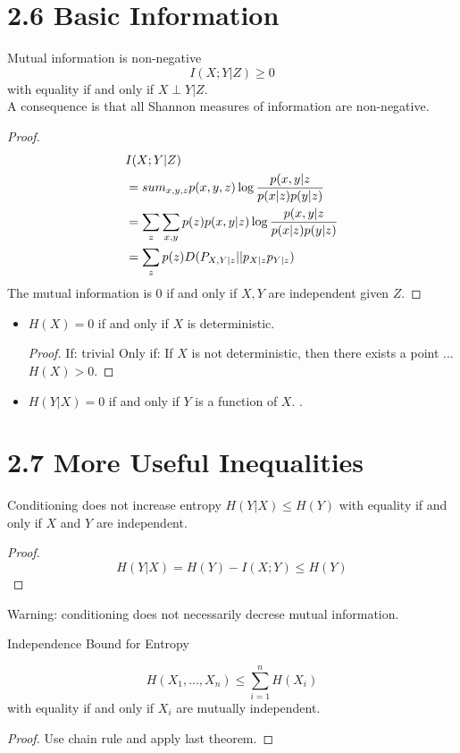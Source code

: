 \documentclass[../main.tex]{subfiles}
\begin{document}
\section{2.6 Basic Information}
\begin{bbox}{Mutual information is non-negative}
    \begin{equation*}
        I(X;Y|Z)\geq 0
    \end{equation*} with equality if and only if $X\perp Y|Z$.\\
    A consequence is that all Shannon measures of information are non-negative.
    \begin{proof}
    \begin{align*}
        &I(X;Y|Z)\\
        &=sum_{x,y,z}p(x,y,z)\log\frac{p(x,y|z}{p(x|z)p(y|z)}\\
        &= \sum_z\sum_{x,y} p(z)p(x,y|z)\log \frac{p(x,y|z}{p(x|z)p(y|z)}\\
        &= \sum_zp(z)D(P_{X,Y|z}||p_{X|z}p_{Y|z})
    \end{align*}
    The mutual information is $0$ if and only if $X,Y$ are independent given $Z$.
    \end{proof}
\end{bbox}
\begin{itemize}
    \item $H(X)=0$ if and only if $X$ is deterministic.
    \begin{proof}
        If: trivial
        Only if: If $X$ is not deterministic, then there exists a point ... $H(X)>0$.
    \end{proof}
    \item $H(Y|X)=0$ if and only if $Y$ is a function of $X$.
.\end{itemize}

\section{2.7 More Useful Inequalities}
\begin{bbox}{Conditioning does not increase entropy}
    $H(Y|X)\leq H(Y)$ with equality if and only if $X$ and $Y$ are independent.
    \begin{proof}
        \begin{equation*}
            H(Y|X)=H(Y)-I(X;Y)\leq H(Y)
        \end{equation*}
    \end{proof}
Warning: conditioning does not necessarily decrese mutual information.
\end{bbox}
\begin{bbox}{Independence Bound for Entropy}
    \begin{theorem*}
        \begin{equation*}
            H(X_1,...,X_n)\leq \sum_{i=1}^n H(X_i)
        \end{equation*} with equality if and only if $X_i$ are mutually independent.
    \end{theorem*}
    \begin{proof}
        Use chain rule and apply last theorem.
    \end{proof}
\end{bbox}
\end{document}
